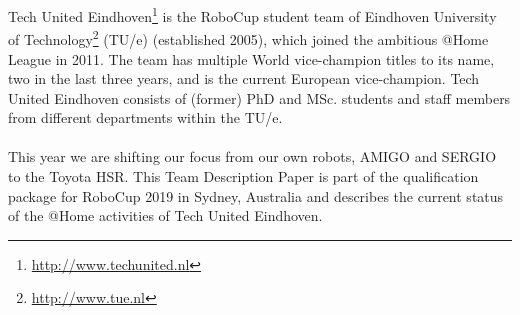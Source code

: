 Tech United Eindhoven\footnote{\url{http://www.techunited.nl}} is the RoboCup student team of Eindhoven University of Technology\footnote{\url{http://www.tue.nl}} (TU/e) (established 2005), which joined the ambitious @Home League in 2011. 
The team has multiple World vice-champion titles to its name, two in the last three years, and is the current European vice-champion. 
Tech United Eindhoven consists of (former) PhD and MSc. students and staff members from different departments within the TU/e.
\\
\\
This year we are shifting our focus from our own robots, AMIGO and SERGIO to the Toyota HSR.
This Team Description Paper is part of the qualification package for RoboCup 2019 in Sydney, Australia and describes the current status of the @Home activities of Tech United Eindhoven.
